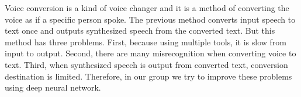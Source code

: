 \begin{eabstract}
Voice conversion is a kind of voice changer and it is a method of converting the voice as if a specific person spoke. The previous method converts input speech to text once and outputs synthesized speech from the converted text. But this method has three problems. First, because using multiple tools, it is slow from input to output. Second, there are many misrecognition when converting voice to text. Third, when synthesized speech is output from converted text, conversion destination is limited. Therefore, in our group we try to improve these problems using deep neural network.
\\[5mm]

\end{eabstract}
